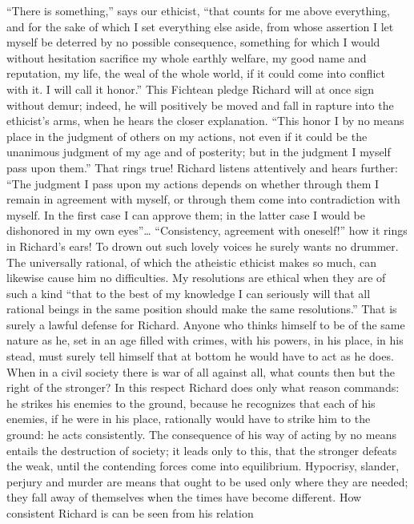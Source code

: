 \documentclass[12pt,a4paper,openany]{book}
\newcommand{\opage}[1]{\marginnote{\footnotesize\textit{[#1]}}}
\begin{document}
``There is something,'' says our ethicist, ``that counts for
me above everything, and for the sake of which I set everything else
aside, from whose assertion I let myself be deterred by no possible
consequence, something for which I would without
hesitation sacrifice my whole earthly welfare, my
good name and reputation, my life, the weal of the whole world,
if it could come into conflict with it. I will call
it honor.'' This Fichtean pledge Richard will
at once sign without demur; indeed, he will positively
be moved and fall in rapture into the ethicist's arms,
when he hears the closer explanation. ``This honor
I by no means place in the judgment of others on my actions,
not even if it could be the unanimous judgment of my age and
of posterity; but in the judgment I myself
pass upon them.'' That rings true! Richard listens attentively
and hears further: ``The judgment I pass upon my
actions depends on whether through them I remain in agreement
with myself, or through them come into
contradiction with myself. In the first case I can
approve them; in the latter case I would be dishonored
in my own eyes''\dots{} ``Consistency, agreement with
oneself!'' how it rings in Richard's ears! To
\setcounter{footnote}{0}%
\opage{542}drown out such lovely voices he surely wants no
drummer. The universally rational, of which the atheistic
ethicist makes so much, can likewise cause
him no difficulties. My resolutions are ethical
when they are of such a kind ``that to the best of my
knowledge I can seriously will that all rational beings in
the same position should make the same resolutions.''
That is surely a lawful defense for Richard. Anyone
who thinks himself to be of the same nature as he, set in an age
filled with crimes, with his powers,
in his place, in his stead, must surely tell himself that
at bottom he would have to act as he does. When in a
civil society there is war of all against all, what counts
then but the right of the stronger? In this respect
Richard does only what reason commands: he strikes his
enemies to the ground, because he recognizes that each of
his enemies, if he were in his place, rationally
would have to strike him to the ground: he acts consistently.
The consequence of his way of acting by no means entails
the destruction of society; it leads only to this, that the stronger
defeats the weak, until the contending forces
come into equilibrium. Hypocrisy, slander, perjury and murder
are means that ought to be used only where they are needed; they
fall away of themselves when the times have become different.
How consistent Richard is can be seen from his relation
\end{document}
